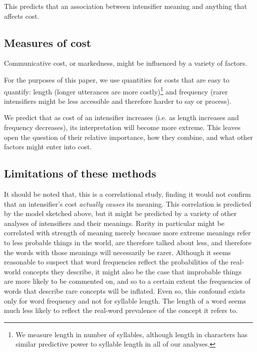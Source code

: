 \documentclass[10pt,letterpaper]{article}
\begin{document}
This predicts that an association between intensifier meaning and anything that affects cost.

\subsection{Measures of cost}


Communicative cost, or markedness,
might be influenced by a variety of factors.

For the purposes of this paper, we use quantities for costs that are easy to quantify: length (longer utterances are more costly)\footnote{We measure length in number of syllables, although length in characters has similar
predictive power to syllable length in all of our analyses.}
and frequency (rarer intensifiers might be less accessible and therefore harder to say or process).

We predict that as cost of an intensifier increases (i.e. as length increases and frequency decreases), its interpretation will become more extreme. This leaves open the question of their relative importance,
how they combine,
and what other factors %
might enter into cost.

\subsection{Limitations of these methods}
It should be noted that, this is a correlational study, finding it would not confirm that an intensifier's cost \emph{actually causes} its meaning. This correlation is predicted by the model sketched above, but it might be predicted by a variety of other analyses of intensifiers and their meanings. Rarity in particular might be correlated with strength of meaning merely because more extreme meanings refer to less probable things in the world, are therefore talked about less, and therefore the words with those meanings will necessarily be rarer. Although it seems reasonable to suspect that word frequencies reflect the probabilities of the real-world concepts they describe, it might also be the case that improbable things are more likely to be commented on, and so to a certain extent the frequencies of words that describe rare concepts will be inflated. Even so, this confound exists only for word frequency and not for syllable length. The length of a word seems much less likely to reflect the real-word prevalence of the concept it refers to.
\end{document}
